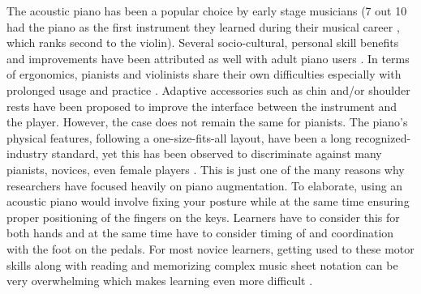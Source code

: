 \documentclass[sigconf, screen, review]{acmart}
\begin{document}
The acoustic piano has been a popular choice by early stage musicians (7 out 10 had the piano as the first instrument they learned during their musical career \cite{sloboda1992transitions}, which ranks second to the violin). Several socio-cultural, personal skill benefits and improvements have been attributed as well with adult piano users \cite{jutras2006benefits}. In terms of ergonomics, pianists and violinists share their own difficulties especially with prolonged usage and practice \cite{chi2020ergonomics}. Adaptive accessories such as chin and/or shoulder rests have been proposed to improve the interface between the instrument and the player. However, the case does not remain the same for pianists. The piano's physical features, following a one-size-fits-all layout, have been a long recognized-industry standard, yet this has been observed to discriminate against many pianists, novices, even female players \cite{boyle2012experience}. This is just one of the many reasons why researchers have focused heavily on piano augmentation. To elaborate, using an acoustic piano would involve fixing your posture while at the same time ensuring proper positioning of the fingers on the keys. Learners have to consider this for both hands and at the same time have to consider timing of and coordination with the foot on the pedals. For most novice learners, getting used to these motor skills along with reading and memorizing complex music sheet notation can be very overwhelming which makes learning even more difficult \cite{highben2004effects}. 
\end{document}
